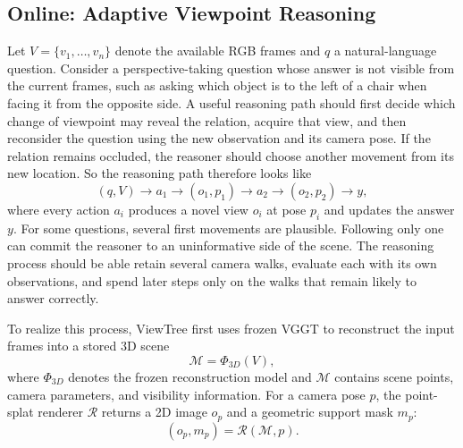 \documentclass[sigconf,10pt]{acmart}
\newcommand{\system}{ViewTree\xspace}
\begin{document}
	\subsection{Online: Adaptive Viewpoint Reasoning}
	\label{sec:overview-reasoning}
	Let $V=\{v_1,\ldots,v_n\}$ denote the available RGB frames and $q$ a natural-language question. Consider a perspective-taking question whose answer is not visible from the current frames, such as asking which object is to the left of a chair when facing it from the opposite side. A useful reasoning path should first decide which change of viewpoint may reveal the relation, acquire that view, and then reconsider the question using the new observation and its camera pose. If the relation remains occluded, the reasoner should choose another movement from its new location. So the reasoning path therefore looks like
	\begin{equation}
		(q,V)\rightarrow a_1\rightarrow(o_1,p_1)
		\rightarrow a_2\rightarrow(o_2,p_2)\rightarrow y,
		\label{eq:reasoning-path}
	\end{equation}
	where every action $a_i$ produces a novel view $o_i$ at pose $p_i$ and updates the answer $y$. For some questions, several first movements are plausible. Following only one can commit the reasoner to an uninformative side of the scene. The reasoning process should be able retain several camera walks, evaluate each with its own observations, and spend later steps only on the walks that remain likely to answer correctly.
	
	To realize this process, \system first uses frozen VGGT to reconstruct the input frames into a stored 3D scene
	\begin{equation}
		\mathcal{M}=\Phi_{3D}(V),
	\end{equation}
	where $\Phi_{3D}$ denotes the frozen reconstruction model and $\mathcal{M}$ contains scene points, camera parameters, and visibility information. For a camera pose $p$, the point-splat renderer $\mathcal{R}$ returns a 2D image $o_p$ and a geometric support mask $m_p$:
	\begin{equation}
		(o_p,m_p)=\mathcal{R}(\mathcal{M},p).
		\label{eq:observe}
	\end{equation}
	
\end{document}
